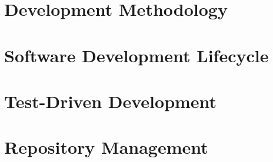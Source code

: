 \section{Development Methodology}


\section{Software Development Lifecycle}


\section{Test-Driven Development}


\section{Repository Management}